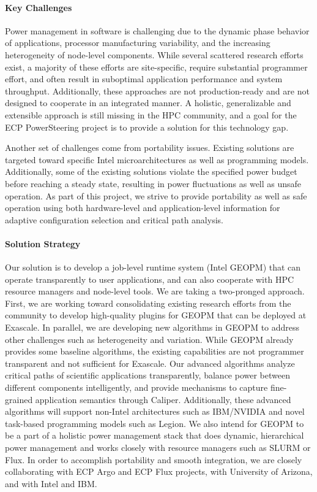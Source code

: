 \paragraph{Key Challenges}
Power management in software is challenging due to the dynamic phase behavior of applications, processor manufacturing variability, and the increasing heterogeneity of node-level components. While several scattered research efforts exist, a majority of these efforts are site-specific, require substantial programmer effort, and often result in suboptimal application performance and system throughput. Additionally, these approaches are not production-ready and are not designed to cooperate in an integrated manner. A holistic, generalizable and extensible approach is still missing in the HPC community, and a goal for the ECP PowerSteering project is to provide a solution for this technology gap. 

Another set of challenges come from portability issues. Existing solutions are targeted toward specific Intel microarchitectures as well as programming models. Additionally, some of the existing solutions  violate the specified power budget before reaching a steady state, resulting in power fluctuations as well as unsafe operation. As part of this project, we strive to provide portability as well as safe operation using both hardware-level and application-level information for adaptive configuration selection and critical path analysis.

\paragraph{Solution Strategy}
Our solution is to develop a job-level runtime system (Intel GEOPM) that can operate transparently to user applications, and can also cooperate with HPC resource managers and node-level tools. We are taking a two-pronged approach. First, we are working toward consolidating existing research efforts from the community to develop high-quality plugins for GEOPM that can be deployed at Exascale. In parallel, we are developing new algorithms in GEOPM to address other challenges such as heterogeneity and variation. While GEOPM already provides some baseline algorithms, the existing capabilities are not programmer transparent and not sufficient for Exascale. Our advanced algorithms analyze critical paths of scientific applications transparently, balance power between different components intelligently, and provide mechanisms to capture fine-grained application semantics through Caliper. Additionally, these advanced algorithms will support non-Intel architectures such as IBM/NVIDIA and novel task-based programming models such as Legion. We also intend for GEOPM to be a part of a holistic power management stack that does dynamic, hierarchical power management and works closely with resource managers such as SLURM or Flux.  In order to accomplish portability and smooth integration, we are closely collaborating with ECP Argo and ECP Flux projects, with University of Arizona, and with Intel and IBM. 

